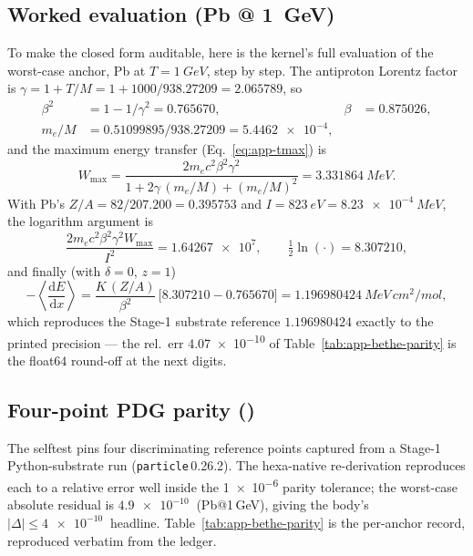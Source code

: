 \subsection{Worked evaluation (Pb @ \SI{1}{GeV})}
\label{app:bethe-worked}

To make the closed form auditable, here is the kernel's full evaluation
of the worst-case anchor, Pb at $T=\SI{1}{GeV}$, step by step. The
antiproton Lorentz factor is $\gamma = 1 + T/M = 1 + 1000/938.27209 =
2.065789$, so
\begin{align}
\beta^2 &= 1 - 1/\gamma^2 = 0.765670, & \beta &= 0.875026, \\
m_e/M &= 0.51099895/938.27209 = \num{5.4462e-4}, &&
\end{align}
and the maximum energy transfer (Eq.~\ref{eq:app-tmax}) is
\begin{equation}
W_{\max} = \frac{2 m_e c^2\beta^2\gamma^2}
   {1 + 2\gamma\,(m_e/M) + (m_e/M)^2}
   = \SI{3.331864}{MeV}.
\end{equation}
With Pb's $Z/A = 82/207.200 = 0.395753$ and $I=\SI{823}{eV}=
\SI{8.23e-4}{MeV}$, the logarithm argument is
\begin{equation}
\frac{2 m_e c^2\beta^2\gamma^2 W_{\max}}{I^2} = \num{1.64267e7},
\qquad \tfrac12\ln(\cdot) = 8.307210,
\end{equation}
and finally (with $\delta=0$, $z=1$)
\begin{equation}
-\left\langle\frac{\mathrm{d}E}{\mathrm{d}x}\right\rangle
  = \frac{K\,(Z/A)}{\beta^2}\,\big[8.307210 - 0.765670\big]
  = \SI{1.196980424}{MeV\,cm^2/mol},
\end{equation}
which reproduces the Stage-1 substrate reference $1.196980424$ exactly to
the printed precision --- the rel.\ err \num{4.07e-10} of
Table~\ref{tab:app-bethe-parity} is the float64 round-off at the next
digits.

\subsection{Four-point PDG parity (\tierGreen)}
\label{app:bethe-parity}

The selftest pins four discriminating reference points captured from a
Stage-1 Python-substrate run (\texttt{particle}\,0.26.2). The
hexa-native re-derivation reproduces each to a relative error well inside
the \SI{1e-6}{} parity tolerance; the worst-case absolute residual is
$\SI{4.9e-10}{}$ (Pb@1\,GeV), giving the body's
$|\Delta|\!\le\!\SI{4e-10}{}$ headline. Table~\ref{tab:app-bethe-parity}
is the per-anchor record, reproduced verbatim from the ledger.

